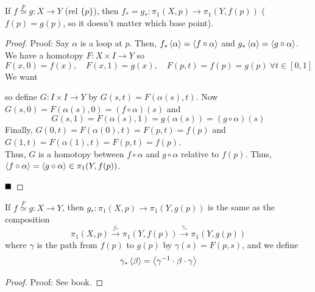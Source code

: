 \begin{theorem}
    If $f \overset{F}{\simeq} g : X \to Y$ (rel $\{p\}$), then $f_* = g_* : \pi_1(X, p) \to \pi_1(Y, f(p))$ ($f(p) = g(p)$, so it doesn't matter which base point).
\end{theorem}
\begin{proof}{Proof:}
    Say $\alpha$ is a loop at $p$. Then, $f_*\left\langle {\alpha} \right\rangle = \left\langle {f \circ \alpha} \right\rangle$ and $g_*\left\langle {\alpha} \right\rangle = \left\langle {g \circ \alpha} \right\rangle$. We have a homotopy $F : X \times I \to Y$ so
    \[ F(x, 0) = f(x), \quad F(x, 1) = g(x), \quad F(p, t) = f(p) = g(p)\ \forall t \in [0, 1] \]
    We want
    \begin{center}
    \end{center}
    so define $G : I \times I \to Y$ by $G(s, t) = F(\alpha(s), t)$. Now $G(s, 0) = F(\alpha(s), 0) = (f \circ \alpha)(s)$ and
    \[ G(s, 1) = F(\alpha(s), 1) = g(\alpha(s)) = (g \circ \alpha)(s) \]
    Finally, $G(0, t) = F(\alpha(0), t) = F(p, t) = f(p)$ and $G(1, t) = F(\alpha(1), t) = F(p, t) = f(p)$.\\

    Thus, $G$ is a homotopy between $f \circ \alpha$ and $g \circ \alpha$ relative to $f(p)$. Thus, $\left\langle {f \circ \alpha} \right\rangle = \left\langle {g \circ \alpha} \right\rangle \in \pi_1(Y, f(p))$.

    $\qed$
\end{proof}

\begin{theorem}
    If $f \overset{F}{\simeq} g : X \to Y$, then $g_* : \pi_1(X, p) \to \pi_1(Y, g(p))$ is the same as the composition
    \[ \pi_1(X, p) \xrightarrow{f_*} \pi_1(Y, f(p)) \xrightarrow{\gamma_*} \pi_1(Y, g(p)) \]
    where $\gamma$ is the path from $f(p)$ to $g(p)$ by $\gamma(s) = F(p, s)$, and we define
    \[ \gamma_*\left\langle {\beta} \right\rangle = \left\langle {\gamma^{-1} \cdot \beta \cdot \gamma} \right\rangle \]
\end{theorem}
\begin{proof}{Proof:}
    See book.
\end{proof}

